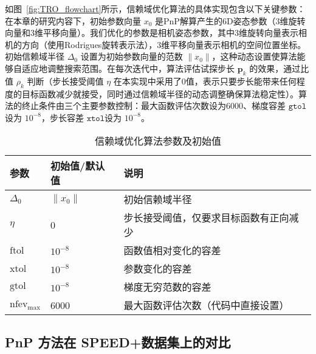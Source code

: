 如图~\ref{fig:TRO_flowchart}所示，信赖域优化算法的具体实现包含以下关键参数：在本章的研究内容下，初始参数向量 $x_0$ 是PnP解算产生的6D姿态参数（3维旋转向量和3维平移向量）。我们优化的参数是相机姿态参数，其中3维旋转向量表示相机的方向（使用Rodrigues旋转表示法），3维平移向量表示相机的空间位置坐标。初始信赖域半径 $\Delta_0$ 设置为初始参数向量的范数 $\|x_0\|$，这种动态设置使算法能够自适应地调整搜索范围。在每次迭代中，算法评估试探步长 $\mathbf{p}_k$ 的效果，通过比值 $\rho_k$ 判断（步长接受阈值 $\eta$ 在本实现中采用了0值，表示只要步长能带来任何程度的目标函数减少就接受，同时通过信赖域半径的动态调整确保算法稳定性）。算法的终止条件由三个主要参数控制：最大函数评估次数设为6000、梯度容差 $\texttt{gtol}$设为 $10^{-8}$，步长容差 $\texttt{xtol}$设为 $10^{-8}$。
\begin{table}[htbp]
	\centering
	\caption{信赖域优化算法参数及初始值}
	\label{tab:tr_parameters}
	\begin{tabular}{llp{8cm}}
		\hline
		参数 & 初始值/默认值 & 说明 \\
		\hline
		$\Delta_0$ & $\|x_0\|$ & 初始信赖域半径\\
		$\eta$ & 0 & 步长接受阈值，仅要求目标函数有正向减少 \\
		$\text{ftol}$ & $10^{-8}$ & 函数值相对变化的容差 \\
		$\text{xtol}$ & $10^{-8}$ & 参数变化的容差 \\
		$\text{gtol}$ & $10^{-8}$ & 梯度无穷范数的容差 \\
		$\text{nfev}_\text{max}$ & 6000 & 最大函数评估次数（代码中直接设置） \\
		\hline
	\end{tabular}
\end{table}


\subsection{PnP 方法在 SPEED+数据集上的对比}
\begin{table}[!htbp]
	\centering
	\caption{在SPEED+合成数据集上的PnP算法对比}
	\label{tab:PnPCmp}
\end{table}

